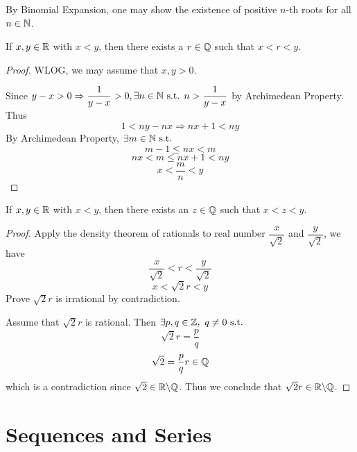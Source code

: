 \documentclass[a4paper,12pt]{article}
\begin{document}
\begin{remark}
    By Binomial Expansion, one may show the existence of positive \(n\)-th roots for all \(n\in\mathbb{N}\).\\
\end{remark}

\begin{theorem}
    If \(x,y\in\mathbb{R}\) with \(x<y\), then there exists a   \(r\in\mathbb{Q}\) such that \(x<r<y\).
    \begin{proof}
        WLOG, we may assume that \(x,y>0\).

        Since \(y-x>0\Rightarrow\dfrac{1}{y-x}>0,\exists n\in\mathbb{N}\text{ s.t. } n>\dfrac{1}{y-x}\) by Archimedean Property. Thus 
        \[1<ny-nx\Rightarrow nx+1<ny\]
        By Archimedean Property, \(\exists m\in\mathbb{N}\text{ s.t. }\)
        \[m-1\le nx<m\]
        \[nx<m\le nx+1<ny\]
        \[x<\frac{m }{n }<y\]
    \end{proof}
\end{theorem}

\newpage

\begin{corollary}
    If \(x,y\in\mathbb{R}\) with \(x<y\), then there exists an  \(z\in\mathbb{Q}\) such that \(x<z<y\).
    \begin{proof}
        Apply the density theorem of rationals to real number \(\dfrac{x }{\sqrt{2}}\) and \(\dfrac{y }{\sqrt{2}}\), we have 
        \[\frac{x }{\sqrt{2}}<r<\frac{y }{\sqrt{2}}\]
        \[x<\sqrt{2}r<y\]
         Prove \(\sqrt{2}r\) is irrational by contradiction.
        
        Assume that \(\sqrt{2}r\) is rational. Then \(\exists p,q\in\Z,\ q\neq0\st\)
        \[\sqrt{2}r=\frac{p }{q}\]
        \[\sqrt{2}=\frac{p}{q}r\in\mathbb{Q}\]
        which is a contradiction since \(\sqrt{2}\in\mathbb{R}\backslash\mathbb{Q}\). Thus we conclude that \(\sqrt{2}r\in\mathbb{R}\backslash\mathbb{Q}\).
    \end{proof}
\end{corollary}


\newpage
\section{Sequences and Series}
\end{document}
